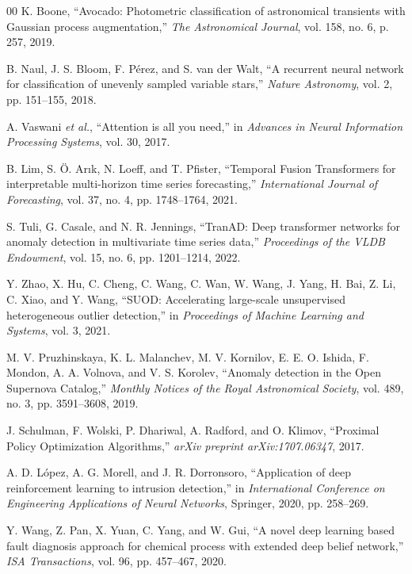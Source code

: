 \documentclass[conference]{IEEEtran}
\begin{document}
\begin{thebibliography}{00}
K. Boone, ``Avocado: Photometric classification of astronomical transients with Gaussian process augmentation,'' \textit{The Astronomical Journal}, vol. 158, no. 6, p. 257, 2019.

B. Naul, J. S. Bloom, F. P\'{e}rez, and S. van der Walt, ``A recurrent neural network for classification of unevenly sampled variable stars,'' \textit{Nature Astronomy}, vol. 2, pp. 151--155, 2018.

A. Vaswani \textit{et al.}, ``Attention is all you need,'' in \textit{Advances in Neural Information Processing Systems}, vol. 30, 2017.

B. Lim, S. \"{O}. Ar{\i}k, N. Loeff, and T. Pfister, ``Temporal Fusion Transformers for interpretable multi-horizon time series forecasting,'' \textit{International Journal of Forecasting}, vol. 37, no. 4, pp. 1748--1764, 2021.

S. Tuli, G. Casale, and N. R. Jennings, ``TranAD: Deep transformer networks for anomaly detection in multivariate time series data,'' \textit{Proceedings of the VLDB Endowment}, vol. 15, no. 6, pp. 1201--1214, 2022.

Y. Zhao, X. Hu, C. Cheng, C. Wang, C. Wan, W. Wang, J. Yang, H. Bai, Z. Li, C. Xiao, and Y. Wang, ``SUOD: Accelerating large-scale unsupervised heterogeneous outlier detection,'' in \textit{Proceedings of Machine Learning and Systems}, vol. 3, 2021.

M. V. Pruzhinskaya, K. L. Malanchev, M. V. Kornilov, E. E. O. Ishida, F. Mondon, A. A. Volnova, and V. S. Korolev, ``Anomaly detection in the Open Supernova Catalog,'' \textit{Monthly Notices of the Royal Astronomical Society}, vol. 489, no. 3, pp. 3591--3608, 2019.

J. Schulman, F. Wolski, P. Dhariwal, A. Radford, and O. Klimov, ``Proximal Policy Optimization Algorithms,'' \textit{arXiv preprint arXiv:1707.06347}, 2017.

A. D. L\'{o}pez, A. G. Morell, and J. R. Dorronsoro, ``Application of deep reinforcement learning to intrusion detection,'' in \textit{International Conference on Engineering Applications of Neural Networks}, Springer, 2020, pp. 258--269.

Y. Wang, Z. Pan, X. Yuan, C. Yang, and W. Gui, ``A novel deep learning based fault diagnosis approach for chemical process with extended deep belief network,'' \textit{ISA Transactions}, vol. 96, pp. 457--467, 2020.


\end{thebibliography}
\end{document}
